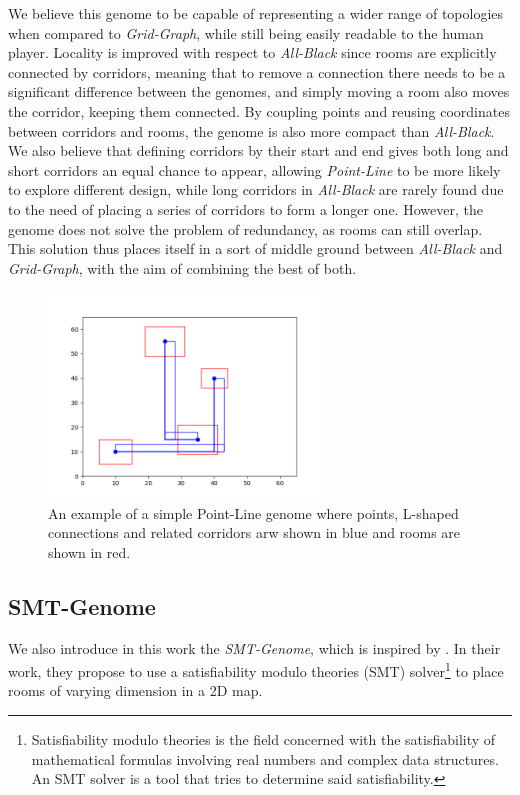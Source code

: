 \documentclass{Configuration_Files/PoliMi3i_thesis}
\begin{document}
We believe this genome to be capable of representing a wider range of topologies when compared to \textit{Grid-Graph}, while still being easily readable to the human player. Locality is improved with respect to \textit{All-Black} since rooms are explicitly connected by corridors, meaning that to remove a connection there needs to be a significant difference between the genomes, and simply moving a room also moves the corridor, keeping them connected. By coupling points and reusing coordinates between corridors and rooms, the genome is also more compact than \textit{All-Black}. We also believe that defining corridors by their start and end gives both long and short corridors an equal chance to appear, allowing \textit{Point-Line} to be more likely to explore different design, while long corridors in \textit{All-Black} are rarely found due to the need of placing a series of corridors to form a longer one.  However, the genome does not solve the problem of redundancy, as rooms can still overlap. This solution thus places itself in a sort of middle ground between \textit{All-Black} and \textit{Grid-Graph}, with the aim of combining the best of both.

\begin{figure}[hbt!]
    \centering
    \includegraphics[width=0.65\textwidth]{images/PointGenome.png}
    \caption[Point-Line example]{An example of a simple Point-Line genome where points, L-shaped connections and related corridors arw shown in blue and rooms are shown in red.}
    \label{fig:point_line}
\end{figure}

\subsection{SMT-Genome}
\label{subsec:smt_genome}

We also introduce in this work the \textit{SMT-Genome}, which is inspired by \citet{whitehead_spatial_2020}. In their work, they propose to use a satisfiability modulo theories (SMT) solver\footnote{Satisfiability modulo theories is the field concerned with the satisfiability of mathematical formulas involving real numbers and complex data structures. An SMT solver is a tool that tries to determine said satisfiability.} to place rooms of varying dimension in a 2D map. 
\end{document}

